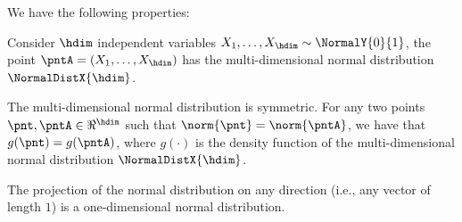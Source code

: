 \begin {lemma} We have the following properties: \begin {compactenumA} \par \smallskip \item Consider $\hdim $ independent variables $X_1, \ldots , X_\hdim \sim \NormalY {0}{1}$, the point $\pntA = (X_1, \ldots , X_\hdim )$ has the multi-dimensional normal distribution $\NormalDistX {\hdim }$. \par \smallskip \item The multi-dimensional normal distribution is symmetric. For any two points $\pnt , \pntA \in \Re ^\hdim $ such that $\norm { \pnt } = \norm {\pntA }$, we have that $g(\pnt ) = g(\pntA )$, where $g(\cdot )$ is the density function of the multi-dimensional normal distribution $\NormalDistX {\hdim }$. \par \smallskip \item The projection of the normal distribution on any direction (i.e., any vector of length $1$) is a one-dimensional normal distribution. \end {compactenumA} \end {lemma}
